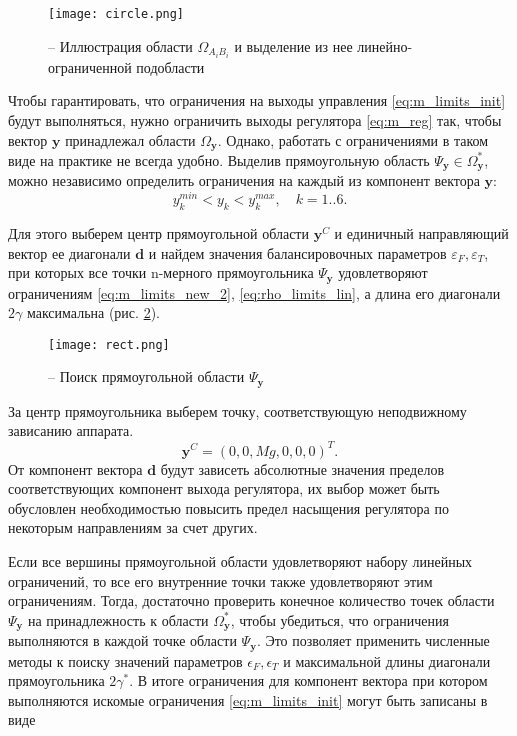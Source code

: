 \begin{figure}[h!]
	\centering
	\texttt{[image: circle.png]}
	\caption{ -- Иллюстрация области $\Omega_{A_iB_i}$ и выделение из нее линейно-ограниченной подобласти}
	\label{fig:lim_circle}
\end{figure}

Чтобы гарантировать, что ограничения на выходы управления \eqref{eq:m_limits_init} будут выполняться, нужно ограничить выходы регулятора
\eqref{eq:m_reg}
так, чтобы вектор
$\bm y$
принадлежал области
$\Omega_{\bm{y}}$.
Однако, работать с ограничениями в таком виде на практике не всегда удобно. Выделив прямоугольную область $\Psi_{\bm y} \in \Omega^*_{\bm y}$, можно независимо определить ограничения на каждый из компонент вектора $\bm y$:
\begin{equation} \label{rect_in}
y_k^{min} < y_k < y_k^{max},
\quad k = 1 .. 6.
\end{equation}

Для этого выберем центр прямоугольной области
$\bm y^C$
и единичный направляющий вектор ее диагонали
$\bm d$
и найдем значения балансировочных параметров
$\varepsilon_F, \varepsilon_T$,
при которых все точки n-мерного прямоугольника
$\Psi_{\bm y}$
удовлетворяют ограничениям \eqref{eq:m_limits_new_2}, \eqref{eq:rho_limits_lin}, а длина его диагонали $2\gamma$ максимальна (рис. \ref{fig:reqct_finding}).
\begin{figure}[h!]
	\centering
	\texttt{[image: rect.png]}
	\caption{ -- Поиск прямоугольной области $\Psi_{\boldsymbol{y}}$}
	\label{fig:reqct_finding}
\end{figure}
За центр прямоугольника выберем точку, соответствующую неподвижному зависанию аппарата. 
\begin{equation} \label{center}
\bm y^C = (0, 0, Mg, 0, 0, 0)^T.
\end{equation}
От компонент вектора $\bm d$ будут зависеть абсолютные значения пределов соответствующих компонент выхода регулятора, их выбор может быть обусловлен необходимостью повысить предел насыщения регулятора по некоторым направлениям за счет других. 

Если все вершины прямоугольной области удовлетворяют набору линейных ограничений, то все его внутренние точки также удовлетворяют этим ограничениям. Тогда, достаточно проверить конечное количество точек области $\Psi_{\bm y}$ на принадлежность к области $\Omega^*_{\bm y}$, чтобы убедиться, что ограничения выполняются в каждой точке области $\Psi_{\bm y}$. Это позволяет применить численные методы к поиску значений параметров $\epsilon_F, \epsilon_T$ и максимальной длины диагонали прямоугольника $2\gamma^*$. В итоге ограничения для компонент вектора  при котором выполняются искомые ограничения \eqref{eq:m_limits_init} могут быть записаны в виде

